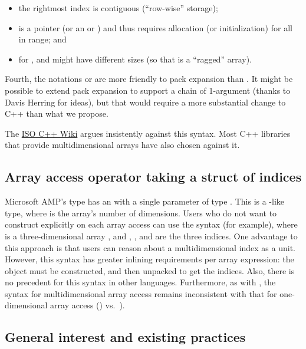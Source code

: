 \documentclass{wg21}
\begin{document}
\begin{itemize}
\item the rightmost index is contiguous (``row-wise'' storage);
\item {} is a pointer (or an  or )
  and thus requires allocation (or initialization) for all  in range; and
\item for ,  and  might have different sizes
  (so that  is a ``ragged'' array).
\end{itemize}

Fourth, the notations  or  are more friendly to pack expansion than .  It might be possible to extend pack expansion to support a chain of 1-argument  (thanks to Davis Herring for ideas), but that would require a more substantial change to C++ than what we propose.

The \href{https://isocpp.org/wiki/faq/operator-overloading#matrix-array-of-array}{ISO C++ Wiki} argues insistently against this syntax.  Most C++ libraries that provide multidimensional arrays have also chosen against it.

\subsection{Array access operator taking a struct of indices}

Microsoft AMP's  type has an  with a single parameter of type .  This is a -like type, where  is the array's number of dimensions.  Users who do not want to construct  explicitly on each array access can use the syntax  (for example), where  is a three-dimensional array , and , , and  are the three indices.  One advantage to this approach is that users can reason about a multidimensional index as a unit.  However, this syntax has greater inlining requirements per array expression: the  object must be constructed, and then unpacked to get the indices.  Also, there is no precedent for this  syntax in other languages.  Furthermore, as with , the syntax for multidimensional array access remains inconsistent with that for one-dimensional array access () vs.\ ).

\subsection{General interest and existing practices}
\end{document}
